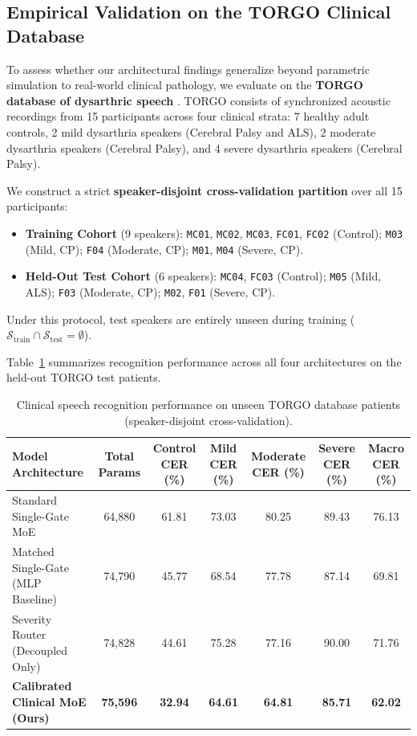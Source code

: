 \documentclass[10pt,twocolumn]{article}
\makeatletter
\newenvironment{adjustbox}[1]{%
  \begin{lrbox}{\@adjbox}%
}{%
  \end{lrbox}%
  \resizebox{\linewidth}{!}{\usebox{\@adjbox}}%
}
\makeatother
\begin{document}
\subsection{Empirical Validation on the TORGO Clinical Database}

To assess whether our architectural findings generalize beyond parametric simulation to real-world clinical pathology, we evaluate on the \textbf{TORGO database of dysarthric speech} \cite{rudzicz2012torgo}. TORGO consists of synchronized acoustic recordings from 15 participants across four clinical strata: 7 healthy adult controls, 2 mild dysarthria speakers (Cerebral Palsy and ALS), 2 moderate dysarthria speakers (Cerebral Palsy), and 4 severe dysarthria speakers (Cerebral Palsy).

We construct a strict \textbf{speaker-disjoint cross-validation partition} over all 15 participants:
\begin{itemize}
    \item \textbf{Training Cohort} (9 speakers): \texttt{MC01}, \texttt{MC02}, \texttt{MC03}, \texttt{FC01}, \texttt{FC02} (Control); \texttt{M03} (Mild, CP); \texttt{F04} (Moderate, CP); \texttt{M01}, \texttt{M04} (Severe, CP).
    \item \textbf{Held-Out Test Cohort} (6 speakers): \texttt{MC04}, \texttt{FC03} (Control); \texttt{M05} (Mild, ALS); \texttt{F03} (Moderate, CP); \texttt{M02}, \texttt{F01} (Severe, CP).
\end{itemize}
Under this protocol, test speakers are entirely unseen during training ($\mathcal{S}_{\text{train}} \cap \mathcal{S}_{\text{test}} = \emptyset$).

Table~\ref{tab:torgo_results} summarizes recognition performance across all four architectures on the held-out TORGO test patients.

\begin{table}[!t]
\centering
\caption{Clinical speech recognition performance on unseen TORGO database patients (speaker-disjoint cross-validation).}
\label{tab:torgo_results}
\begin{adjustbox}{width=\textwidth}
\begin{tabular}{lcccccc}
\toprule
\textbf{Model Architecture} & \textbf{Total Params} & \textbf{Control CER (\%)} & \textbf{Mild CER (\%)} & \textbf{Moderate CER (\%)} & \textbf{Severe CER (\%)} & \textbf{Macro CER (\%)} \\
\midrule
Standard Single-Gate MoE & 64,880 & 61.81 & 73.03 & 80.25 & 89.43 & 76.13 \\
Matched Single-Gate (MLP Baseline) & 74,790 & 45.77 & 68.54 & 77.78 & 87.14 & 69.81 \\
Severity Router (Decoupled Only) & 74,828 & 44.61 & 75.28 & 77.16 & 90.00 & 71.76 \\
\textbf{Calibrated Clinical MoE (Ours)} & \textbf{75,596} & \textbf{32.94} & \textbf{64.61} & \textbf{64.81} & \textbf{85.71} & \textbf{62.02} \\
\bottomrule
\end{tabular}
\end{adjustbox}
\end{table}
\end{document}
